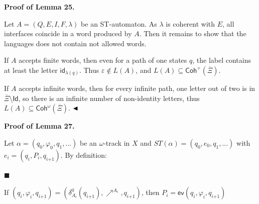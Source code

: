 \par\medskip\noindent\textbf{Proof of Lemma 25.}\par
 
 
Let $A=(Q,E,I,F,\lambda)$ be an ST-automaton. As $\lambda$ is coherent with $E$, all interfaces coincide in a word produced by $A$. Then it remains to show that the languages does not contain not allowed words.\par
 
 
 
If $A$ accepts finite words, then even for a path of one states $q$, the label contains at least the letter $\mathsf{id}_{\lambda(q)}$. Thus $\varepsilon\not\in L(A)$, and $L(A)\subseteq\mathsf{Coh}^{+}(\overline{\Xi})$.\par
 
 
 
If $A$ accepts infinite words, then for every infinite path, one letter out of two is in $\overline{\Xi}\setminus\mathsf{Id}$, so there is an infinite number of non-identity letters, thus $L(A)\subseteq\mathsf{Coh}^{\omega}(\overline{\Xi})$. $\hfill\blacktriangleleft$\par
 
 
 
 
\par\medskip\noindent\textbf{Proof of Lemma 27.}\par
 
 
Let $\alpha=(q_{0},\varphi_{0},q_{1},...)$ be an $\omega$-track in $X$ and $ST(\alpha)=(q_{0},e_{0},q_{1},...)$ with $e_{i}=(q_{i},P_{i},q_{i\text{+}1})$. By definition:\par
  
\par\noindent  $\blacksquare$ 
 
If $(q_{i},\varphi_{i},q_{i\text{+}1})=(\delta_{A_{i}}^{0}(q_{i\text{+}1}),\mathrel{\nearrow^{A_{i}}},q_{i\text{+}1})$, then $P_{i}=\mathsf{ev}(q_{i},\varphi_{i},q_{i\text{+}1})$\par
 
